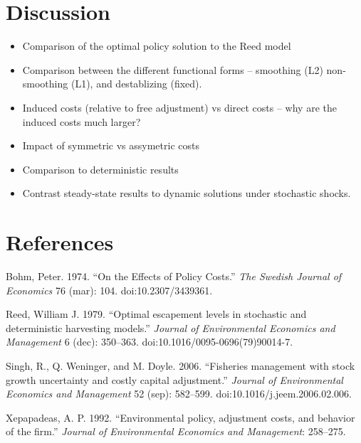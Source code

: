 \documentclass[review, 12pt]{elsarticle}
\begin{document}
\section{Discussion}

\begin{itemize}
\item   Comparison of the optimal policy solution to the Reed model
\item  Comparison between the different functional forms -- smoothing (L2)
  non-smoothing (L1), and destablizing (fixed).
\item   Induced costs (relative to free adjustment) vs direct costs -- why are
  the induced costs much larger?
\item   Impact of symmetric vs assymetric costs
\item   Comparison to deterministic results
\item   Contrast steady-state results to dynamic solutions under stochastic
  shocks.
\end{itemize}


\section{References}

Bohm, Peter. 1974. ``On the Effects of Policy Costs.'' \emph{The Swedish
Journal of Economics} 76 (mar): 104. doi:10.2307/3439361.

Reed, William J. 1979. ``Optimal escapement levels in stochastic and
deterministic harvesting models.'' \emph{Journal of Environmental
Economics and Management} 6 (dec): 350--363.
doi:10.1016/0095-0696(79)90014-7.

Singh, R., Q. Weninger, and M. Doyle. 2006. ``Fisheries management with
stock growth uncertainty and costly capital adjustment.'' \emph{Journal
of Environmental Economics and Management} 52 (sep): 582--599.
doi:10.1016/j.jeem.2006.02.006.

Xepapadeas, A. P. 1992. ``Environmental policy, adjustment costs, and
behavior of the firm.'' \emph{Journal of Environmental Economics and
Management}: 258--275.
\end{document}
